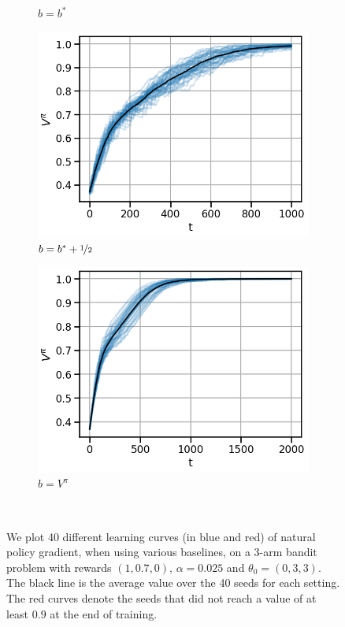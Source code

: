 \begin{figure}[!ht]
\begin{subfigure}[b]{0.245\linewidth}
    \caption{$b = b^\ast$}
  \end{subfigure}
  \begin{subfigure}[b]{0.245\linewidth}
    \includegraphics[width=\textwidth]{articles/baselines/figs/appendix_figs_3arm_033/natural_minvar_05_eta=0025.png}
    \caption{$b = b^\ast + \nicefrac{1}{2}$}
  \end{subfigure}
  \begin{subfigure}[b]{0.245\linewidth}
    \includegraphics[width=\textwidth]{articles/baselines/figs/appendix_figs_3arm_033/natural_value_0_eta=0025.png}
    \caption{$b=V^\pi$}
  \end{subfigure}
  \caption{We plot 40 different learning curves (in blue and red) of natural policy gradient, when using various baselines, on a 3-arm bandit problem with rewards $(1, 0.7, 0)$, $\alpha = 0.025$ and $\theta_0 = (0, 3, 3)$. The black line is the average value over the 40 seeds for each setting. The red curves denote the seeds that did not reach a value of at least $0.9$ at the end of training.}~\label{appfig:learning_curves_npg_033}
\end{figure}
